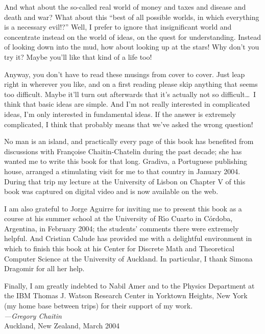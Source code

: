 \documentclass[12pt]{book}
\begin{document}
And what about the so-called real world of money and taxes and disease and death and war?
What about this ``best of all possible worlds, in which everything is a necessary evil!?''
Well, I prefer to ignore that insignificant world and concentrate instead on the world of
ideas, on the quest for understanding.  Instead of looking down into the mud, how about looking
up at the stars!  Why don't you try it? Maybe you'll like that kind of a life too!

Anyway, you don't have to read these musings from cover to cover.
Just leap right in wherever you like, and on a first reading 
please skip anything that seems too difficult.
Maybe it'll turn out afterwards that it's actually not so difficult\ldots\
I think that basic ideas are simple. And I'm not really interested in complicated ideas,
I'm only interested in fundamental ideas.
If the answer is extremely complicated, 
I think that probably means that we've asked the wrong question!

No man is an island, and practically every page of this book has benefited from
discussions with Fran\c{c}oise Chaitin-Chatelin during the past decade;
she has wanted me to write this book for that long.  
Gradiva, a Portuguese publishing house, arranged a stimulating visit
for me to that country in January 2004.
During that trip my lecture at the University of Lisbon on Chapter V
of this book was captured on digital video and is now available on the web.

I am also grateful to Jorge Aguirre for inviting me to present this book as a course
at his summer school at the University of R\'{\i}o Cuarto in C\'ordoba, Argentina, in
February 2004; the students' comments there were extremely helpful.  And Cristian Calude has
provided me with a delightful environment in which to finish this book at
his Center for Discrete Math and Theoretical Computer Science at the University
of Auckland. In particular, I thank Simona Dragomir for all her help.  

Finally, I am greatly indebted to Nabil Amer and to the Physics Department
at the IBM Thomas J. Watson Research Center in Yorktown Heights, New York 
(my home base between trips) for their support of my work.
\vspace{\baselineskip}
\\
\emph{---Gregory Chaitin}
\vspace{.5\baselineskip}
\\
Auckland, New Zealand, March 2004

\markright{}
\newpage
\section*{}
\end{document}
